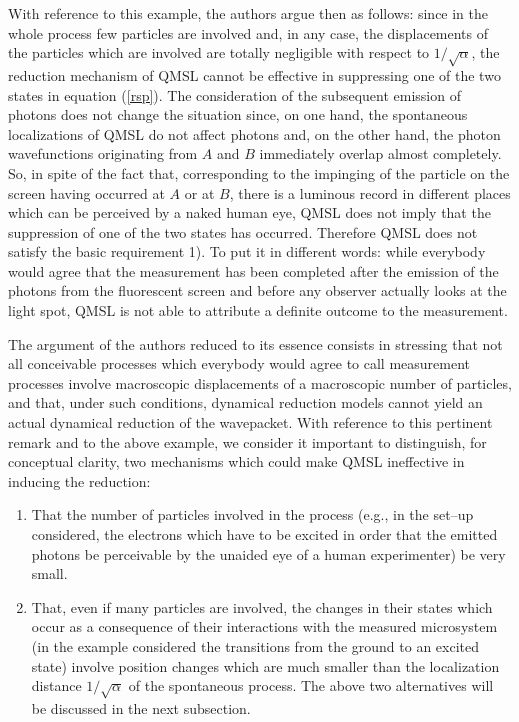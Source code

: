 \documentclass[10pt,a4paper]{article}
\begin{document}
With reference to this example, the authors argue then as follows:
since in the whole process few particles are involved and, in any
case, the displacements of the particles which are involved are
totally negligible with respect to $1/\sqrt{\alpha}$, the
reduction mechanism of QMSL cannot be effective in suppressing one
of the two states in equation (\ref{rsp}). The consideration of
the subsequent emission of photons does not change the situation
since, on one hand, the spontaneous localizations of QMSL do not
affect photons and, on the other hand, the photon wavefunctions
originating from $A$ and $B$ immediately overlap almost
completely. So, in spite of the fact that, corresponding to the
impinging of the particle on the screen having occurred at $A$ or
at $B$, there is a luminous record in different places which can
be perceived by a naked human eye, QMSL does not imply that the
suppression of one of the two states has occurred. Therefore QMSL
does not satisfy the basic requirement 1). To put it in different
words: while everybody would agree that the measurement has been
completed after the emission of the photons from the fluorescent
screen and before any observer actually looks at the light spot,
QMSL is not able to attribute a definite outcome to the
measurement.

The argument of the authors reduced to its essence consists in
stressing that not all conceivable processes which everybody would
agree to call measurement processes involve macroscopic
displacements of a macroscopic number of particles, and that,
under such conditions, dynamical reduction models cannot yield an
actual dynamical reduction of the wavepacket. With reference to
this pertinent remark and to the above example, we consider it
important to distinguish, for conceptual clarity, two mechanisms
which could make QMSL ineffective in inducing the reduction:
\begin{enumerate}
\item That the number of particles involved in the process (e.g.,
in the set--up considered, the electrons which have to be excited
in order that the emitted photons be perceivable by the unaided
eye of a human experimenter) be very small.

\item That, even if many particles are involved, the changes in
their states which occur as a consequence of their interactions
with the measured microsystem (in the example considered the
transitions from the ground to an excited state) involve position
changes which are much smaller than the localization distance
$1/\sqrt{\alpha}$ of the spontaneous process. The above two
alternatives will be discussed in the next subsection.
\end{enumerate}
\end{document}
